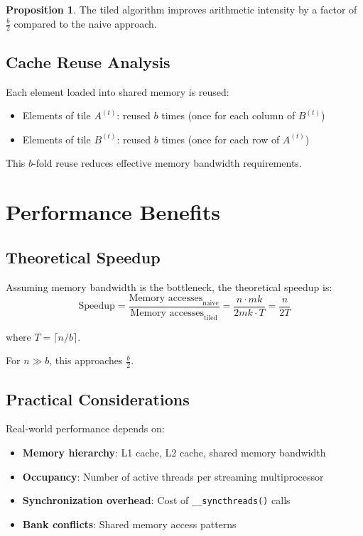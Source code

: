 \documentclass{amsbook}
\theoremstyle{definition}
\newtheorem{proposition}{Proposition}[chapter]
\begin{document}
\begin{proposition}
The tiled algorithm improves arithmetic intensity by a factor of $\frac{b}{2}$ compared to the naive approach.
\end{proposition}

\subsection{Cache Reuse Analysis}

Each element loaded into shared memory is reused:
\begin{itemize}
\item Elements of tile $A^{(t)}$: reused $b$ times (once for each column of $B^{(t)}$)
\item Elements of tile $B^{(t)}$: reused $b$ times (once for each row of $A^{(t)}$)
\end{itemize}

This $b$-fold reuse reduces effective memory bandwidth requirements.

\section{Performance Benefits}

\subsection{Theoretical Speedup}

Assuming memory bandwidth is the bottleneck, the theoretical speedup is:
\begin{equation}
\text{Speedup} = \frac{\text{Memory accesses}_{\text{naive}}}{\text{Memory accesses}_{\text{tiled}}} = \frac{n \cdot mk}{2mk \cdot T} = \frac{n}{2T}
\end{equation}

where $T = \lceil n/b \rceil$.

For $n \gg b$, this approaches $\frac{b}{2}$.

\subsection{Practical Considerations}

Real-world performance depends on:
\begin{itemize}
\item \textbf{Memory hierarchy}: L1 cache, L2 cache, shared memory bandwidth
\item \textbf{Occupancy}: Number of active threads per streaming multiprocessor
\item \textbf{Synchronization overhead}: Cost of \texttt{\_\_syncthreads()} calls
\item \textbf{Bank conflicts}: Shared memory access patterns
\end{itemize}
\end{document}

